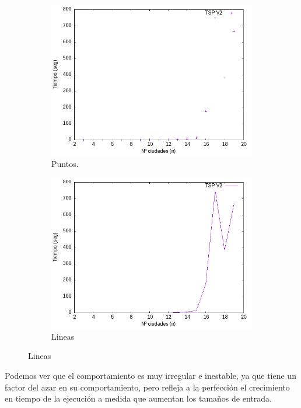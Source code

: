 \documentclass{article}
\begin{document}
\begin{figure}[H]
    \centering
    \begin{subfigure}[b]{0.45\textwidth}
        \centering
        \includegraphics[width=\textwidth]{Sucio_Olga/DatosBK/salidaSoloPuntos.png}
        \caption{Puntos.}
    \end{subfigure}
    \begin{subfigure}[b]{0.45\textwidth}
        \centering
        \includegraphics[width=\textwidth]{Sucio_Olga/DatosBK/salidaSoloLineas.png}
        \caption{Lineas}
    \end{subfigure}
\end{figure}

Podemos ver que el comportamiento es muy irregular e inestable, ya que tiene un factor del azar en su comportamiento, pero refleja a la perfección el crecimiento en tiempo de la ejecución a medida que aumentan los tamaños de entrada. 
\end{document}
